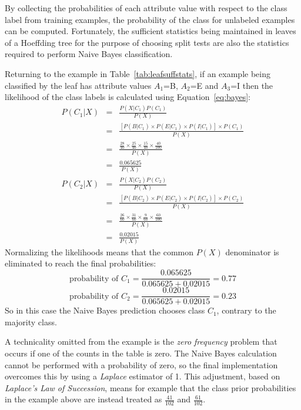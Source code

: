 By collecting the probabilities of each attribute value with respect to the class label from training examples, the probability of the class for unlabeled examples can be computed. Fortunately, the sufficient statistics being maintained in leaves of a Hoeffding tree for the purpose of choosing split tests are also the statistics required to perform Naive Bayes classification. 

Returning to the example in Table~\ref{tab:leafsuffstats}, if an example being classified by the leaf has attribute values $A_{1}$=B, $A_{2}$=E and $A_{3}$=I then the likelihood of the class labels is calculated using Equation~\ref{eq:bayes}:
\begin{eqnarray*}
P(C_{1}|X) & = & \frac{ P(X|C_{1}) P(C_{1})}{P(X)} \\
& = & \frac{ [P(B|C_{1}) \times P(E|C_{1}) \times P(I|C_{1})] \times P(C_{1})}{P(X)} \\
& = & \frac{\frac{28}{40} \times \frac{25}{40} \times \frac{15}{40} \times \frac{40}{100}}{P(X)} \\
& = & \frac{0.065625}{P(X)}
\end{eqnarray*}
\begin{eqnarray*}
P(C_{2}|X) & = & \frac{ P(X|C_{2}) P(C_{2})}{P(X)} \\
& = & \frac{ [P(B|C_{2}) \times P(E|C_{2}) \times P(I|C_{2})] \times P(C_{2})}{P(X)} \\
& = & \frac{\frac{26}{60} \times \frac{31}{60} \times \frac{9}{60} \times \frac{60}{100}}{P(X)} \\
& = & \frac{0.02015}{P(X)}
\end{eqnarray*}
Normalizing the likelihoods means that the common $P(X)$ denominator is eliminated to reach the final probabilities:
\begin{displaymath}
\mbox{probability of } C_{1} = \frac{0.065625}{0.065625 + 0.02015} = 0.77
\end{displaymath}
\begin{displaymath}
\mbox{probability of } C_{2} = \frac{0.02015}{0.065625 + 0.02015} = 0.23
\end{displaymath}
So in this case the Naive Bayes prediction chooses class $C_{1}$, contrary to the majority class.

A technicality omitted from the example is the {\em zero frequency} problem that occurs if one of the counts in the table is zero. The Naive Bayes calculation cannot be performed with a probability of zero, so the final implementation overcomes this by using a {\em Laplace} estimator of  1.
This adjustment, based on {\em Laplace's Law of Succession}, means for example that the class prior probabilities in the example above are instead treated as $\frac{41}{102}$ and $\frac{61}{102}$.

